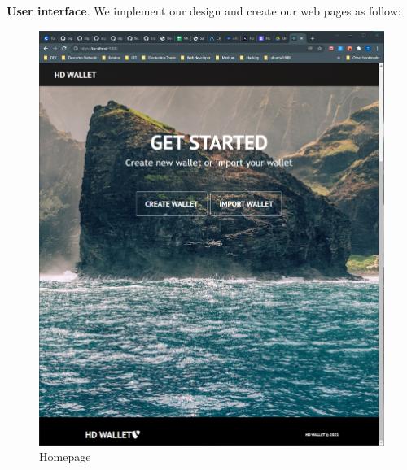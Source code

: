 \bigskip
{\textbf{User interface}}. We implement our design and create our web pages as follow:

\begin{figure}[h!]
    \centering
    \includegraphics[width=1\textwidth]{images/Homepage.png}
    \caption[Homepage]{Homepage}
    \label{fig:homepage}
  \end{figure}


